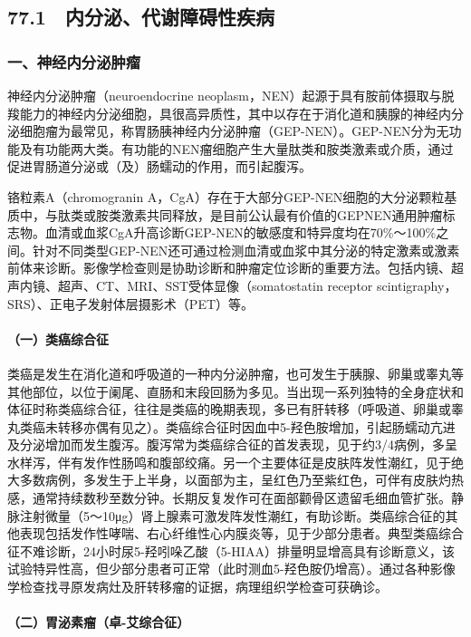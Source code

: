 \subsection{77.1　内分泌、代谢障碍性疾病}

\subsubsection{一、神经内分泌肿瘤}

神经内分泌肿瘤（neuroendocrine
neoplasm，NEN）起源于具有胺前体摄取与脱羧能力的神经内分泌细胞，具很高异质性，其中以存在于消化道和胰腺的神经内分泌细胞瘤为最常见，称胃肠胰神经内分泌肿瘤（GEP-NEN）。GEP-NEN分为无功能及有功能两大类。有功能的NEN瘤细胞产生大量肽类和胺类激素或介质，通过促进胃肠道分泌或（及）肠蠕动的作用，而引起腹泻。

铬粒素A（chromogranin
A，CgA）存在于大部分GEP-NEN细胞的大分泌颗粒基质中，与肽类或胺类激素共同释放，是目前公认最有价值的GEPNEN通用肿瘤标志物。血清或血浆CgA升高诊断GEP-NEN的敏感度和特异度均在70\%～100\%之间。针对不同类型GEP-NEN还可通过检测血清或血浆中其分泌的特定激素或激素前体来诊断。影像学检查则是协助诊断和肿瘤定位诊断的重要方法。包括内镜、超声内镜、超声、CT、MRI、SST受体显像（somatostatin
receptor scintigraphy，SRS）、正电子发射体层摄影术（PET）等。

\paragraph{（一）类癌综合征}

类癌是发生在消化道和呼吸道的一种内分泌肿瘤，也可发生于胰腺、卵巢或睾丸等其他部位，以位于阑尾、直肠和末段回肠为多见。当出现一系列独特的全身症状和体征时称类癌综合征，往往是类癌的晚期表现，多已有肝转移（呼吸道、卵巢或睾丸类癌未转移亦偶有见之）。类癌综合征时因血中5-羟色胺增加，引起肠蠕动亢进及分泌增加而发生腹泻。腹泻常为类癌综合征的首发表现，见于约3/4病例，多呈水样泻，伴有发作性肠鸣和腹部绞痛。另一个主要体征是皮肤阵发性潮红，见于绝大多数病例，多发生于上半身，以面部为主，呈红色乃至紫红色，可伴有皮肤灼热感，通常持续数秒至数分钟。长期反复发作可在面部颧骨区遗留毛细血管扩张。静脉注射微量（5～10μg）肾上腺素可激发阵发性潮红，有助诊断。类癌综合征的其他表现包括发作性哮喘、右心纤维性心内膜炎等，见于少部分患者。典型类癌综合征不难诊断，24小时尿5-羟吲哚乙酸（5-HIAA）排量明显增高具有诊断意义，该试验特异性高，但少部分患者可正常（此时测血5-羟色胺仍增高）。通过各种影像学检查找寻原发病灶及肝转移瘤的证据，病理组织学检查可获确诊。

\paragraph{（二）胃泌素瘤（卓-艾综合征）}

